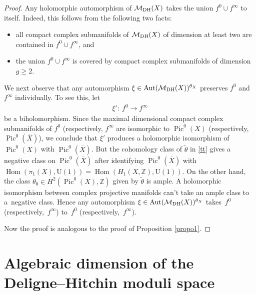 \documentclass[pdftex]{sigma}
\numberwithin{equation}{section}
\begin{document}
\begin{proof}
Any holomorphic automorphism of ${\mathcal M}_{\rm DH}(X)$ takes the union
$f^0\cup f^\infty$ to itself. Indeed, this follows from the following two facts:
\begin{itemize}\itemsep=0pt
\item all compact complex submanifolds of ${\mathcal M}_{\rm DH}(X)$ of dimension at least two are contained in $f^0\cup f^\infty$, and
\item the union $f^0\cup f^\infty$ is covered by compact complex submanifolds of dimension $g \geq 2$.
\end{itemize}

We next observe that any automorphism $\xi \in \operatorname{Aut}({\mathcal M}_{\rm DH}(X))^{\theta_X}$ preserves $f^0$ and $f^\infty$ indivi\-dual\-ly. To see this, let
\begin{gather*}\xi' \colon \ f^0 \longrightarrow f^\infty\end{gather*} be a biholomorphism. Since the maximal dimensional compact complex submanifolds of $f^0$ (respectively, $f^\infty$ are isomorphic to $\operatorname{Pic}^0(X)$ (respectively, $\operatorname{Pic}^0(\overline{X})$), we conclude that $\xi'$ produces a holomorphic isomorphism of $\operatorname{Pic}^0(X)$ with $\operatorname{Pic}^0(\overline{X})$. But the cohomology class of $\widetilde\theta$ in \eqref{tt} gives a negative class on $\operatorname{Pic}^0(\overline{X})$ after identifying $\operatorname{Pic}^0(\overline{X})$ with $\operatorname{Hom}(\pi_1(X), \text{U}(1)) = \operatorname{Hom}(H_1(X, {\mathbb Z}), \text{U}(1))$. On the other hand, the class $\theta_0 \in H^2(\operatorname{Pic}^0(X), {\mathbb Z})$ given by $\widetilde\theta$ is ample. A holomorphic isomorphism between complex projective manifolds can't take an ample class to a~negative class. Hence any automorphism $\xi \in \operatorname{Aut}({\mathcal M}_{\rm DH}(X))^{\theta_X}$ takes~$f^0$ (respectively,~$f^\infty$) to~$f^0$ (respectively,~$f^\infty$).

Now the proof is analogous to the proof of Proposition \ref{propo1}.
\end{proof}

\section{Algebraic dimension of the Deligne--Hitchin moduli space}
\end{document}
